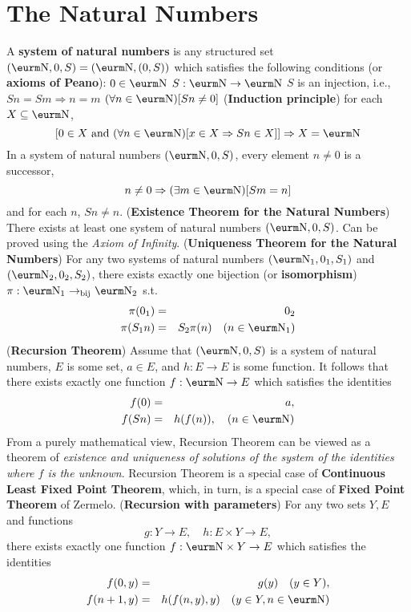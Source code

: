 \documentclass{myproc}
\begin{document}
\section{The Natural Numbers}
\bit
\w A {\bf{}system of natural numbers} is any structured set
	$({\N}, 0, S) = ({\N}, (0, S))$ which satisfies the
	following conditions (or {\bf{}axioms of Peano}):
	\bit
	\w [(a)] $0 \in \N$
	\w [(b)] $S: \N \rightarrow \N$
	\w [(c)] $S$ is an injection, i.e., $Sn = Sm \Rightarrow n = m$
	\w [(d)] $(\forall{}n \in \N)[Sn \ne 0]$
	\w [(e)] ({\bf{}Induction principle}) for each $X \subseteq \N$,
		\[ [0 \in X \mbox{\ and\ } 
			(\forall{n \in {\N}})[x \in X \Rightarrow Sn \in X]]
			\Rightarrow X = {\N} \]
	\eit
\w In a system of natural numbers $({\N}, 0, S)$, every
	element $n \ne 0$ is a successor, 
		\[ n \ne 0 \Rightarrow (\exists{m \in {\N}})[Sm = n] \]
	and for each $n$, $Sn \ne n$.
\w ({\bf{}Existence Theorem for the Natural Numbers})
	There exists at least one system of natural numbers
	$({\N}, 0, S)$.
	\bit
	\w Can be proved using the {\em{}Axiom of Infinity\/}.
	\eit
\w ({\bf{}Uniqueness Theorem for the Natural Numbers})
	For any two systems of natural numbers
	$({\N}_1, 0_1, S_1)$ and
	$({\N}_2, 0_2, S_2)$, there exists exactly one
	bijection (or {\bf{}isomorphism}) 
	$\pi: {\N}_1\ \bij \ \N_2$ s.t.
		\begin{eqnarray*}
		\pi(0_1) & = & 0_2 \\
		\pi(S_1n) & = & S_2\pi(n) \quad (n \in {\N}_1)
		\end{eqnarray*}
\w ({\bf{}Recursion Theorem}) 
	Assume that $({\N}, 0, S)$ is a system of natural numbers,
	$E$ is some set, $a \in E$, and $h: E \rightarrow E$ is some function.
	It follows that there exists exactly one function 
	$f: {\N} \rightarrow E$ which satisfies the identities
	\begin{eqnarray*}
	f(0) & = & a,\\
	f(Sn) & = & h(f(n)), \quad  (n \in {\N})
	\end{eqnarray*}
	\bit
	\w From a purely mathematical view, Recursion Theorem can be viewed
		as a theorem of 
		{\em{}existence and uniqueness of solutions of the system
		of the identities where $f$ is the unknown\/}.
	\w Recursion Theorem is a special case of {\bf{}Continuous
		Least Fixed Point Theorem}, which, in turn, is a special
		case of {\bf{}Fixed Point Theorem} of Zermelo.
	\eit
\w ({\bf{}Recursion with parameters}) For any two sets $Y, E$ and
	functions
		\[g: Y \rightarrow E, \quad h: E\times{Y} \rightarrow E,\]
	there exists exactly one function $f: {\N}\times{Y} \rightarrow E$
	which satisfies the identities
	\begin{eqnarray*}
	f(0, y) & = & g(y) \quad (y \in Y),\\
	f(n+1, y) & = & h(f(n, y), y) \quad (y \in Y, n \in {\N})
	\end{eqnarray*}
\eit
\end{document}
